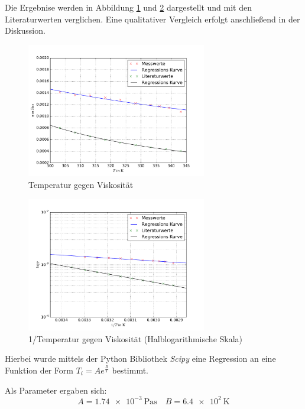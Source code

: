 Die Ergebnise werden in Abbildung \ref{fig:t_v_v} und \ref{fig:t_v_l_v} dargestellt und mit den Literaturwerten verglichen. 
Eine qualitativer Vergleich erfolgt anschließend in der Diskussion.

\FloatBarrier
\begin{figure}
\centering
\includegraphics[width=0.7\textwidth]{pics/viskositaet_temp_mit_lit.pdf}
\caption{Temperatur gegen Viskosität}
\label{fig:t_v_v}
\end{figure}

\begin{figure}
\centering
\includegraphics[width=0.7\textwidth]{pics/viskositaet_temp__log_mit_lit.pdf}
\caption{1/Temperatur gegen Viskosität (Halblogarithmische Skala)} %
\label{fig:t_v_l_v}
\end{figure}
\FloatBarrier

Hierbei wurde mittels der Python Bibliothek \emph{Scipy} eine 
Regression an eine Funktion der Form $T_i = Ae^{\frac{B}{T}}$ bestimmt.

Als Parameter ergaben sich:
\begin{equation*}
A=\SI{1.74e-3}{\pascal\second} \quad B=\SI{6.4e2}{\kelvin} %
\end{equation*}

